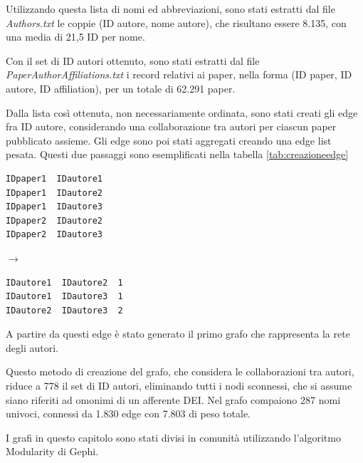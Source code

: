 \documentclass[12pt,a4paper,twoside]{report}
\begin{document}
Utilizzando questa lista di nomi ed abbreviazioni, sono stati estratti dal file \textit{Authors.txt}
le coppie (ID autore, nome autore), che risultano essere 8.135, con una media di 21,5 ID per nome.

Con il set di ID autori ottenuto, sono stati estratti dal file \textit{PaperAuthorAffiliations.txt}
i record relativi ai paper, nella forma (ID paper, ID autore, ID affiliation), per un totale di
62.291 paper.

Dalla lista così ottenuta, non necessariamente ordinata, sono stati creati gli edge fra ID autore,
considerando una collaborazione tra autori per ciascun paper pubblicato assieme. Gli edge sono poi
stati aggregati creando una edge list pesata. Questi due passaggi sono esemplificati nella tabella
\ref{tab:creazioneedge}

\begin{center}

\label{tab:creazioneedge}
\begin{minipage}{0.40\textwidth}
\begin{verbatim}
IDpaper1  IDautore1
IDpaper1  IDautore2
IDpaper1  IDautore3
IDpaper2  IDautore2
IDpaper2  IDautore3
\end{verbatim}
\end{minipage}
\begin{minipage}{0.075\textwidth}
$\rightarrow$
\end{minipage}
\begin{minipage}{0.40\textwidth}
\begin{verbatim}
IDautore1  IDautore2  1
IDautore1  IDautore3  1
IDautore2  IDautore3  2
\end{verbatim}
\end{minipage}
\end{center}
A partire da questi edge è stato generato il primo grafo che rappresenta la rete degli autori.

Questo metodo di creazione del grafo, che considera le collaborazioni tra autori, riduce a 778 il
set di ID autori, eliminando tutti i nodi sconnessi, che si assume siano riferiti ad omonimi di un
afferente DEI. Nel grafo compaiono 287 nomi univoci, connessi da 1.830 edge con 7.803 di peso
totale.

I grafi in questo capitolo sono stati divisi in comunità utilizzando l'algoritmo Modularity di
Gephi.
\end{document}
